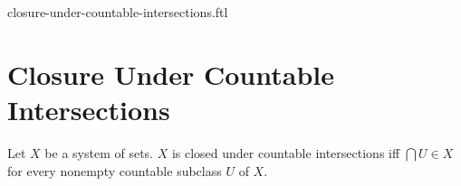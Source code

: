 \documentclass{naproche-library}
\begin{document}
\begin{smodule}{closure-under-countable-intersections.ftl}

  \section*{Closure Under Countable Intersections}

  \begin{definition}[forthel,id=FOUNDATIONS_14_451771879129088,printid]
    Let $X$ be a system of sets.
    $X$ is closed under countable intersections iff $\bigcap U \in X$ for every nonempty countable subclass $U$ of $X$.
  \end{definition}
\end{smodule}
\end{document}

